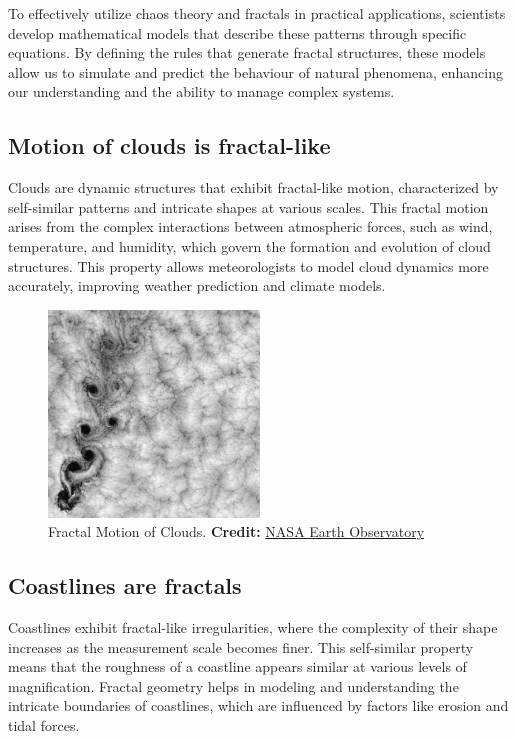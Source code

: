 \documentclass[12pt]{article}
\begin{document}
To effectively utilize chaos theory and fractals in practical applications, scientists develop mathematical models that describe these patterns through specific equations. By defining the rules that generate fractal structures, these models allow us to simulate and predict the behaviour of natural phenomena, enhancing our understanding and the ability to manage complex systems.


\newpage

\subsection{Motion of clouds is fractal-like}
Clouds are dynamic structures that exhibit fractal-like motion, characterized by self-similar patterns and intricate shapes at various scales. This fractal motion arises from the complex interactions between atmospheric forces, such as wind, temperature, and humidity, which govern the formation and evolution of cloud structures. This property allows meteorologists to model cloud dynamics more accurately, improving weather prediction and climate models.

\begin{figure}[H]
\centering
\includegraphics[width=0.5\textwidth]{assets/fractal-clouds.jpg}
\caption{Fractal Motion of Clouds. \textbf{Credit:} \href{https://eoimages.gsfc.nasa.gov/images/imagerecords/0/625/vortex_lg.jpg}{NASA Earth Observatory}}
\label{fig:fractal-clouds}
\end{figure}

\subsection{Coastlines are fractals}
Coastlines exhibit fractal-like irregularities, where the complexity of their shape increases as the measurement scale becomes finer. This self-similar property means that the roughness of a coastline appears similar at various levels of magnification. Fractal geometry helps in modeling and understanding the intricate boundaries of coastlines, which are influenced by factors like erosion and tidal forces.
\end{document}
